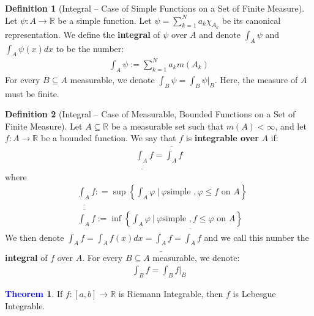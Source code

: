 \documentclass[reqno,11pt]{amsart}
\theoremstyle{definition}
\newcommand{\bb}[1]{\mathbb{#1}}
\newcommand{\sets}[2]{ \left\{ #1\ |\ #2 \right\}}
\newtheorem{theorem}{\textcolor{blue}{Theorem}}
\theoremstyle{definition}
\newtheorem{definition}{\textcolor{OliveGreen}{Definition}}
\theoremstyle{remark}
\newcommand{\upRiemannint}[2]{
  \overline{\int_{#1}^{#2}}
}
\newcommand{\loRiemannint}[2]{
  \underline{\int_{#1}^{#2}}
}
\begin{document}
\begin{definition}[Integral -- Case of Simple Functions on a Set of Finite Measure] Let $\psi: A \rightarrow \bb{R}$ be a simple function. Let $\psi = \sum_{k=1}^N a_k \chi_{A_k} $ be its canonical representation. We define the \textbf{integral} of $\psi$ over $A$ and denote $\int_A \psi$ and $\int_A \psi(x) dx$ to be the number: 
\begin{align}
	\int_A \psi := \sum_{k=1}^N a_k m(A_k) 
\end{align}
	For every $B \subseteq A$ measurable, we denote $\int_B \psi = \int_B \psi|_B$. Here, the measure of $A$ must be finite. 
\end{definition}
\begin{definition}[Integral -- Case of Measurable, Bounded Functions on a Set of Finite Measure] Let $A \subseteq \bb{R}$ be a measurable set such that $m(A) < \infty$, and let $f: A \rightarrow \bb{R}$ be a bounded function. We say that $f$ is \textbf{integrable over} $A$ if: 
	\begin{align}
		\loRiemannint{A}{} f = \upRiemannint{A}{} f
	\end{align}
	where 
	\begin{align*}
		& \loRiemannint{A}{} f : = \sup \sets{\int_A \varphi }{ \varphi \mbox{simple }, \varphi \leq f \mbox{ on } A } \\
		& \upRiemannint{A}{} f := \inf \sets{\int_A \varphi}{\varphi \mbox{simple }, f \leq \varphi \mbox{ on } A}
	\end{align*}
	We then denote $\int_A f = \int_A f(x) dx = \loRiemannint{A}{} f = \upRiemannint{A}{} f$ and we call this number the \textbf{integral} of $f$ over $A$. For every $B \subseteq A$ measurable, we denote: 
	\begin{align*}
		\int_B f = \int_B f|_B	
	\end{align*}
\end{definition}

\begin{theorem}
	If $f: [a,b] \rightarrow \bb{R}$ is Riemann Integrable, then $f$ is Lebesgue Integrable. 
\end{theorem}
\end{document}
